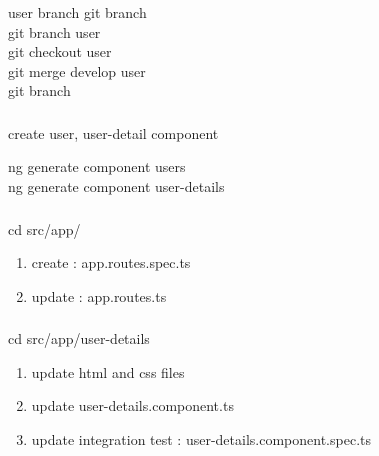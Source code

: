\documentclass{beamer}
\begin{document}
\begin{frame}\frametitle{} 

\begin{block}{user branch}
git branch \\
git branch user \\
git checkout user \\
git merge develop user \\
git branch 
\end{block}

\end{frame}


\begin{frame}\frametitle{} 

\begin{block}{create user, user-detail component}

ng generate component users \\
ng generate component user-details \\


\end{block}

\end{frame}



\begin{frame}\frametitle{} 

cd src/app/ \\


\begin{enumerate}
\item create : app.routes.spec.ts
\item update : app.routes.ts
\end{enumerate}


\end{frame}



\begin{frame}\frametitle{} 


cd src/app/user-details \\


\begin{enumerate}
\item update html and css files
\item update user-details.component.ts 
\item update integration test :  user-details.component.spec.ts
\end{enumerate}


\end{frame}
\end{document}
